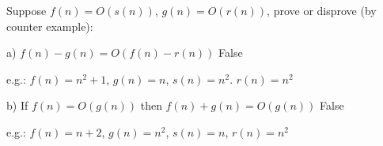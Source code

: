 \begin{prob}

Suppose $f(n) = O(s(n))$, $g(n) = O(r(n))$, prove or disprove (by counter example):

a) $f(n) - g(n) = O(f(n) - r(n))$ False

e.g.: $f(n) = n^2 + 1$, $g(n) = n$, $s(n) = n^2$. $r(n) = n^2$

b) If $f(n) = O(g(n))$ then $f(n) + g(n) = O(g(n))$ False

e.g.: $f(n) = n + 2$, $g(n) = n^2$, $s(n) = n$, $r(n) = n^2$
\end{prob}














